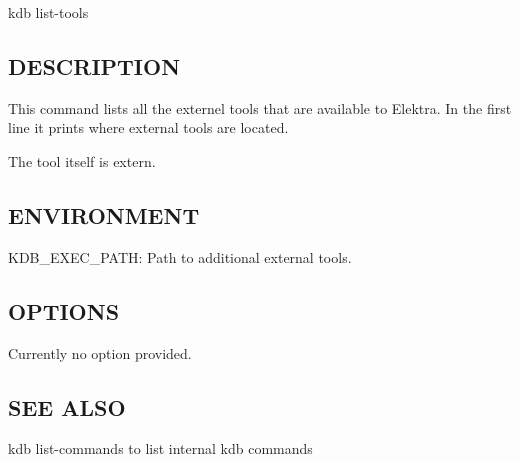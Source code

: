 {\ttfamily kdb list-\/tools}

\subsection*{D\+E\+S\+C\+R\+I\+P\+T\+I\+ON}

This command lists all the externel tools that are available to Elektra. In the first line it prints where external tools are located.

The tool itself is extern.

\subsection*{E\+N\+V\+I\+R\+O\+N\+M\+E\+NT}


\begin{DoxyItemize}
\item {\ttfamily K\+D\+B\+\_\+\+E\+X\+E\+C\+\_\+\+P\+A\+TH}\+: Path to additional external tools.
\end{DoxyItemize}

\subsection*{O\+P\+T\+I\+O\+NS}

Currently no option provided.

\subsection*{S\+EE A\+L\+SO}


\begin{DoxyItemize}
\item {\ttfamily kdb list-\/commands} to list internal kdb commands 
\end{DoxyItemize}